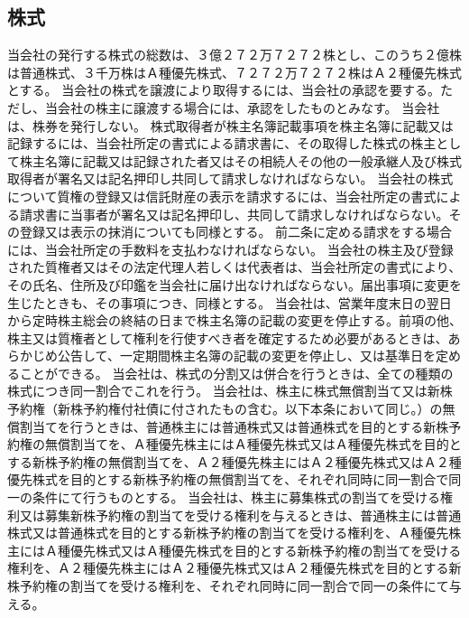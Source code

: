 \documentclass[10pt,a4paper,uplatex]{jsarticle}
\begin{document}
\subsection{株式}
当会社の発行する株式の総数は、３億２７２万７２７２株とし、このうち２億株は普通株式、３千万株はＡ種優先株式、７２７２万７２７２株はＡ２種優先株式とする。
当会社の株式を譲渡により取得するには、当会社の承認を要する。ただし、当会社の株主に譲渡する場合には、承認をしたものとみなす。
当会社は、株券を発行しない。
株式取得者が株主名簿記載事項を株主名簿に記載又は記録するには、当会社所定の書式による請求書に、その取得した株式の株主として株主名簿に記載又は記録された者又はその相続人その他の一般承継人及び株式取得者が署名又は記名押印し共同して請求しなければならない。
当会社の株式について質権の登録又は信託財産の表示を請求するには、当会社所定の書式による請求書に当事者が署名又は記名押印し、共同して請求しなければならない。その登録又は表示の抹消についても同様とする。
前二条に定める請求をする場合には、当会社所定の手数料を支払わなければならない。
当会社の株主及び登録された質権者又はその法定代理人若しくは代表者は、当会社所定の書式により、その氏名、住所及び印鑑を当会社に届け出なければならない。届出事項に変更を生じたときも、その事項につき、同様とする。
当会社は、営業年度末日の翌日から定時株主総会の終結の日まで株主名簿の記載の変更を停止する。前項の他、株主又は質権者として権利を行使すべき者を確定するため必要があるときは、あらかじめ公告して、一定期間株主名簿の記載の変更を停止し、又は基準日を定めることができる。
当会社は、株式の分割又は併合を行うときは、全ての種類の株式につき同一割合でこれを行う。
\term 当会社は、株主に株式無償割当て又は新株予約権（新株予約権付社債に付されたもの含む。以下本条において同じ。）の無償割当てを行うときは、普通株主には普通株式又は普通株式を目的とする新株予約権の無償割当てを、Ａ種優先株主にはＡ種優先株式又はＡ種優先株式を目的とする新株予約権の無償割当てを、Ａ２種優先株主にはＡ２種優先株式又はＡ２種優先株式を目的とする新株予約権の無償割当てを、それぞれ同時に同一割合で同一の条件にて行うものとする。
\term 当会社は、株主に募集株式の割当てを受ける権利又は募集新株予約権の割当てを受ける権利を与えるときは、普通株主には普通株式又は普通株式を目的とする新株予約権の割当てを受ける権利を、Ａ種優先株主にはＡ種優先株式又はＡ種優先株式を目的とする新株予約権の割当てを受ける権利を、Ａ２種優先株主にはＡ２種優先株式又はＡ２種優先株式を目的とする新株予約権の割当てを受ける権利を、それぞれ同時に同一割合で同一の条件にて与える。
\end{document}
